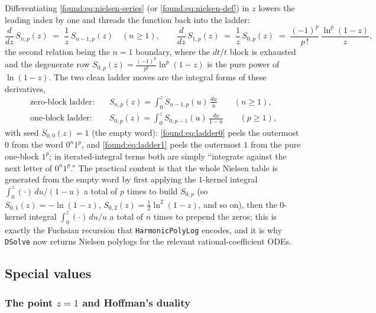Differentiating \eqref{found:eq:nielsen-series} (or \eqref{found:eq:nielsen-def}) in $z$ lowers the leading index by one and threads the function back into the ladder:
\begin{equation}\label{found:eq:dSnp}
  \frac{d}{dz}\,S_{n,p}(z)\;=\;\frac{1}{z}\,S_{n-1,p}(z)\quad(n\ge1),
  \qquad
  \frac{d}{dz}\,S_{1,p}(z)\;=\;\frac{1}{z}\,S_{0,p}(z)\;=\;\frac{(-1)^{p}}{p\,!}\,\frac{\ln^{p}(1-z)}{z},
\end{equation}
the second relation being the $n=1$ boundary, where the $dt/t$ block is exhausted and the degenerate row $S_{0,p}(z)=\tfrac{(-1)^{p}}{p!}\ln^{p}(1-z)$ is the pure power of $\ln(1-z)$. The two clean ladder moves are the integral forms of these derivatives,
\begin{align}
  \text{zero-block ladder:}\quad
    & S_{n,p}(z)=\int_0^{z}S_{n-1,p}(u)\,\frac{du}{u}\qquad (n\ge1),\label{found:eq:ladder0}\\[2pt]
  \text{one-block ladder:}\quad
    & S_{0,p}(z)=\int_0^{z} S_{0,p-1}(u)\,\frac{du}{1-u}\qquad (p\ge1),\label{found:eq:ladder1}
\end{align}
with seed $S_{0,0}(z)=1$ (the empty word): \eqref{found:eq:ladder0} peels the outermost $0$ from the word $0^{n}1^{p}$, and \eqref{found:eq:ladder1} peels the outermost $1$ from the pure one-block $1^{p}$; in iterated-integral terms both are simply ``integrate against the next letter of $0^{n}1^{p}$.'' The practical content is that the whole Nielsen table is generated from the empty word by first applying the $1$-kernel integral $\int_0^{z}(\cdot)\,du/(1-u)$ a total of $p$ times to build $S_{0,p}$ (so $S_{0,1}(z)=-\ln(1-z)$, $S_{0,2}(z)=\tfrac12\ln^{2}(1-z)$, and so on), then the $0$-kernel integral $\int_0^{z}(\cdot)\,du/u$ a total of $n$ times to prepend the zeros; this is exactly the Fuchsian recursion that \texttt{HarmonicPolyLog} encodes, and it is why \texttt{DSolve} now returns Nielsen polylogs for the relevant rational-coefficient ODEs.

\subsection{Special values}

\subsubsection*{The point $z=1$ and Hoffman's duality}

